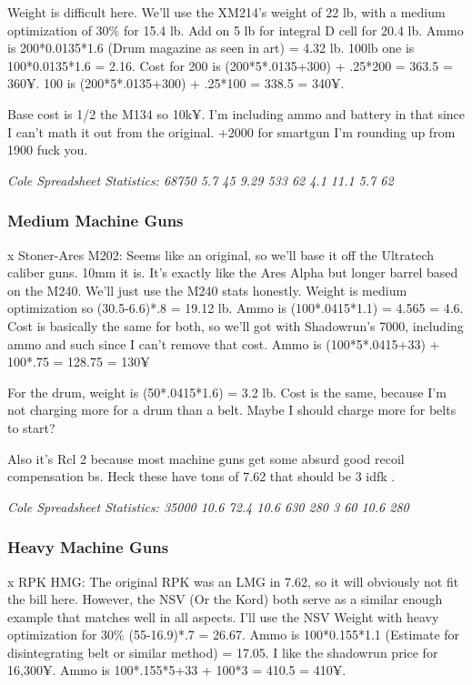 \begin{multicols*}{2}
	Weight is difficult here. We'll use the XM214's weight of 22 lb, with a medium optimization of 30\% for 15.4 lb. Add on 5 lb for integral D cell for 20.4 lb. Ammo is 200*0.0135*1.6 (Drum magazine as seen in art) = 4.32 lb. 100lb one is 100*0.0135*1.6 = 2.16. Cost for 200 is (200*5*.0135+300) + .25*200 = 363.5 = 360¥. 100 is (200*5*.0135+300) + .25*100 = 338.5 = 340¥.
	
	Base cost is 1/2 the M134 so 10k¥. I'm including ammo and battery in that since I can't math it out from the original. +2000 for smartgun I'm rounding up from 1900 fuck you.
	
	\textit{\textcolor{OliveGreen}{Cole Spreadsheet Statistics: 68750 5.7 45 9.29 533 62 4.1 11.1 5.7 62}}
	
	\subsubsection{Medium Machine Guns}
	
	x Stoner-Ares M202: Seems like an original, so we'll base it off the Ultratech caliber guns. 10mm it is. It's exactly like the Ares Alpha but longer barrel based on the M240. We'll just use the M240 stats honestly. Weight is medium optimization so (30.5-6.6)*.8 = 19.12 lb. Ammo is (100*.0415*1.1) = 4.565 = 4.6. Cost is basically the same for both, so we'll got with Shadowrun's 7000, including ammo and such since I can't remove that cost. Ammo is (100*5*.0415+33) + 100*.75 = 128.75 = 130¥
	
	For the drum, weight is (50*.0415*1.6) = 3.2 lb. Cost is the same, because I'm not charging more for a drum than a belt. Maybe I should charge more for belts to start?
	
	Also it's Rcl 2 because most machine guns get some absurd good recoil compensation bs. Heck these have tons of 7.62 that should be 3 idfk \GURPS.
	
	\textit{\textcolor{OliveGreen}{Cole Spreadsheet Statistics: 35000 10.6 72.4 10.6 630 280 3 60 10.6 280}}
	
	\subsubsection{Heavy Machine Guns}
	
	x RPK HMG: The original RPK was an LMG in 7.62, so it will obviously not fit the bill here. However, the NSV (Or the Kord) both serve as a similar enough example that matches well in all aspects. I'll use the NSV Weight with heavy optimization for 30\% (55-16.9)*.7 = 26.67. Ammo is  100*0.155*1.1 (Estimate for disintegrating belt or similar method) = 17.05. I like the shadowrun price for 16,300¥. Ammo is 100*.155*5+33 + 100*3 = 410.5 = 410¥.
	

\end{multicols*}
